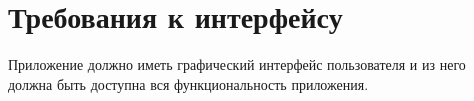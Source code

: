 \section{Требования к интерфейсу}
Приложение должно иметь графический интерфейс пользователя и из него должна быть доступна вся функциональность приложения.

